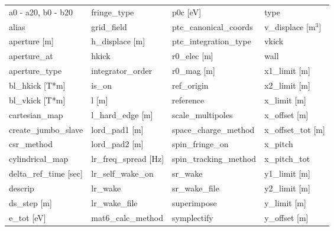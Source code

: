  \begin{tabular}{llll} \toprule
a0 - a20, b0 - b20             & fringe_type                    & p0c [eV]                       & type                           \\
alias                          & grid_field                     & ptc_canonical_coords           & v_displace [m$^3$]             \\
aperture [m]                   & h_displace [m]                 & ptc_integration_type           & vkick                          \\
aperture_at                    & hkick                          & r0_elec [m]                    & wall                           \\
aperture_type                  & integrator_order               & r0_mag [m]                     & x1_limit [m]                   \\
bl_hkick [T*m]                 & is_on                          & ref_origin                     & x2_limit [m]                   \\
bl_vkick [T*m]                 & l [m]                          & reference                      & x_limit [m]                    \\
cartesian_map                  & l_hard_edge [m]                & scale_multipoles               & x_offset [m]                   \\
create_jumbo_slave             & lord_pad1 [m]                  & space_charge_method            & x_offset_tot [m]               \\
csr_method                     & lord_pad2 [m]                  & spin_fringe_on                 & x_pitch                        \\
cylindrical_map                & lr_freq_spread [Hz]            & spin_tracking_method           & x_pitch_tot                    \\
delta_ref_time [sec]           & lr_self_wake_on                & sr_wake                        & y1_limit [m]                   \\
descrip                        & lr_wake                        & sr_wake_file                   & y2_limit [m]                   \\
ds_step [m]                    & lr_wake_file                   & superimpose                    & y_limit [m]                    \\
e_tot [eV]                     & mat6_calc_method               & symplectify                    & y_offset [m]                   \\

\end{tabular}
